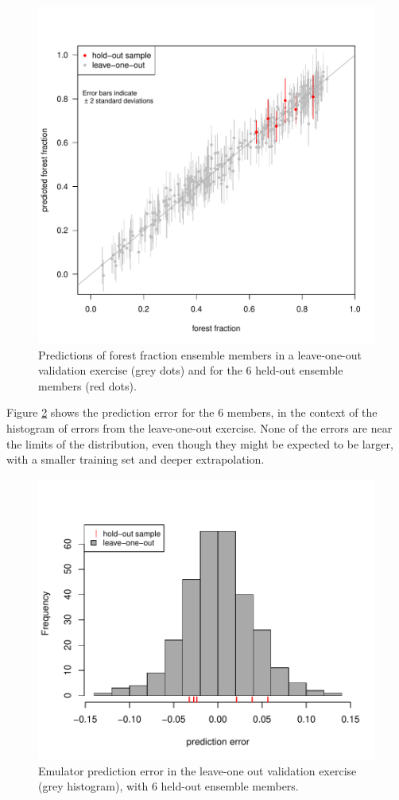 \documentclass[gmd, manuscript]{copernicus} %
\begin{document}
\begin{figure}[t]
\includegraphics[width=12cm]{../graphics/figS02.pdf}
\caption{Predictions of forest fraction ensemble members in a leave-one-out validation exercise (grey dots) and for the 6 held-out ensemble members (red dots).}
\label{fig:holdout1_vs_loo_compact}
\end{figure}

Figure \ref{fig:holdout1_error_hist} shows the prediction error for the 6 members, in the context of the histogram of errors from the leave-one-out exercise. None of the errors are near the limits of the distribution, even though they might be expected to be larger, with a smaller training set and deeper extrapolation.

\begin{figure}[t]
\includegraphics[width=12cm]{../graphics/figS03.pdf}
\caption{Emulator prediction error in the leave-one out validation exercise (grey histogram), with 6 held-out ensemble members.}
\label{fig:holdout1_error_hist}
\end{figure}
\end{document}
